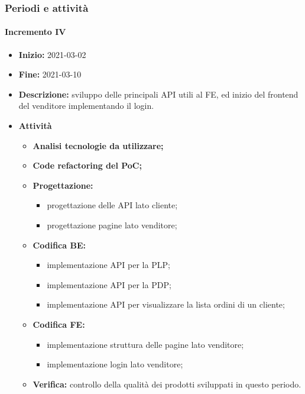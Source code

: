 \subsubsection{Periodi e attività}

\paragraph[Incremento IV]{Incremento IV}
\begin{itemize}
    \item [] \textbf{Inizio:} 2021-03-02
    \item [] \textbf{Fine:} 2021-03-10
    \item [] \textbf{Descrizione:} sviluppo delle principali API utili al FE, ed inizio del frontend del venditore implementando il login.
    \item [] \textbf{Attività}
          \begin{itemize}
              \item \textbf{Analisi tecnologie da utilizzare;}
              \item \textbf{Code refactoring del PoC;}
              \item \textbf{Progettazione:}
                    \begin{itemize}
                        \item progettazione delle API lato cliente;
                        \item progettazione pagine lato venditore;
                    \end{itemize}
              \item \textbf{Codifica BE:}
                    \begin{itemize}
                        \item implementazione API per la PLP;
                        \item implementazione API per la PDP;
                        \item implementazione API per visualizzare la lista ordini di un cliente;
                    \end{itemize}
              \item \textbf{Codifica FE:}
                    \begin{itemize}
                        \item implementazione struttura delle pagine lato venditore;
                        \item implementazione login lato venditore;
                    \end{itemize}
              \item \textbf{Verifica:} controllo della qualità dei prodotti sviluppati in questo periodo.
          \end{itemize}
\end{itemize}

